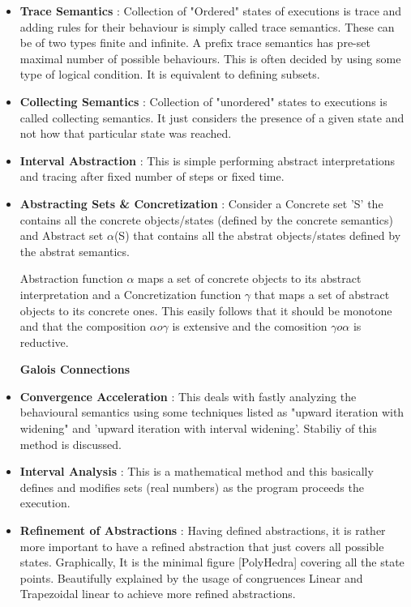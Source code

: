 \begin{itemize}
{	Some graphic example covers possible trajectories and forbidden zones.
	}

	\item{\textbf{Trace Semantics} : 
	Collection of "Ordered" states of executions is trace and adding rules for their behaviour is simply called trace semantics. These can be of two types finite and infinite. A prefix trace semantics has pre-set maximal number of possible behaviours. This is often decided by using some type of logical condition. It is equivalent to defining subsets.
	}
	\item{\textbf{Collecting Semantics} :
	Collection of "unordered" states to executions is called collecting semantics. It just considers the presence of a given state and not how that particular state was reached. 
	}
	\item{\textbf{Interval Abstraction} :
	This is simple performing abstract interpretations and tracing after fixed number of steps or fixed time.
	}
	\item{\textbf{Abstracting Sets \& Concretization} : 
	Consider a Concrete set 'S' the contains all the concrete objects/states (defined by the concrete semantics) and Abstract set $\alpha$(S) that contains all the abstrat objects/states defined by the abstrat semantics.

	Abstraction function $\alpha$ maps a set of concrete objects to its abstract interpretation and a Concretization function $\gamma$ that maps a set of abstract objects to its concrete ones. This easily follows that it should be monotone and that the composition $\alpha o \gamma$ is extensive and the comosition $\gamma o \alpha$ is reductive.

	\textbf{Galois Connections}

	}
	\item{\textbf{Convergence Acceleration} : 
	This deals with fastly analyzing the behavioural semantics using some techniques listed as "upward iteration with widening" and 'upward iteration with interval widening'. Stabiliy of this method is discussed. 
	}
	\item{\textbf{Interval Analysis} : 
	This is a mathematical method and this basically defines and modifies sets (real numbers) as the program proceeds the execution. 
	}
	\item{\textbf{Refinement of Abstractions} : 
	Having defined abstractions, it is rather more important to have a refined abstraction that just covers all possible states. Graphically, It is the minimal figure [PolyHedra] covering all the state points. Beautifully explained by the usage of congruences Linear and Trapezoidal linear to achieve more refined abstractions. 

}
\end{itemize}
